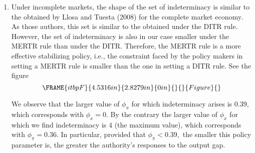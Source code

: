 \documentclass{article}
\begin{document}
\begin{enumerate}
\item Under incomplete markets, the shape of the set of indeterminacy is
similar to the obtained by Llosa and Tuesta (2008) for the complete market
economy$.$ As those authors, this set is similar to the obtained under the
DITR rule. However, the set of indeterminacy is also in our case smaller
under the MERTR rule than under the DITR. Therefore, the MERTR rule is a
more effective stabilizing policy, i.e., the constraint faced by the policy
makers in setting a MERTR rule is smaller than the one in setting a DITR
rule. See the figure%
\begin{equation*}
\FRAME{itbpF}{4.5316in}{2.8279in}{0in}{}{}{Figure}{\special{language
"Scientific Word";type "GRAPHIC";maintain-aspect-ratio TRUE;display
"USEDEF";valid_file "T";width 4.5316in;height 2.8279in;depth
0in;original-width 11.2607in;original-height 6.9998in;cropleft "0";croptop
"1";cropright "1";cropbottom "0";tempfilename
'L59YT900.wmf';tempfile-properties "XPR";}}
\end{equation*}

We observe that the larger value of $\phi _{\pi }$ for which indeterminacy
arises is $0.39,$ which corresponds with $\phi _{x}=0.$ By the contrary the
larger value of $\phi _{x}$ for which we find indeterminacy is $4$ (the
maximum value), which corresponds with $\phi _{\pi }=0.36.$ In particular,
provided that $\phi _{\pi }<0.39,$ the smaller this policy parameter is, the
greater the authority's responses to the output gap.


\end{enumerate}
\end{document}
